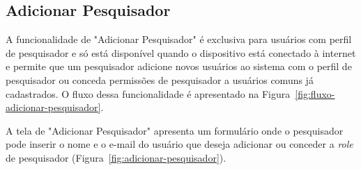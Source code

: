 \subsection{Adicionar Pesquisador}
A funcionalidade de "Adicionar Pesquisador" é exclusiva para usuários com perfil de pesquisador e só 
está disponível quando o dispositivo está conectado à internet e permite que um pesquisador adicione 
novos usuários ao sistema com o perfil de pesquisador ou conceda permissões de pesquisador a usuários 
comuns já cadastrados. O fluxo dessa funcionalidade é apresentado na Figura~\ref{fig:fluxo-adicionar-pesquisador}.

A tela de "Adicionar Pesquisador" apresenta um formulário onde o pesquisador pode inserir o nome e o e-mail 
do usuário que deseja adicionar ou conceder a \textit{role} de pesquisador (Figura~\ref{fig:adicionar-pesquisador}).

